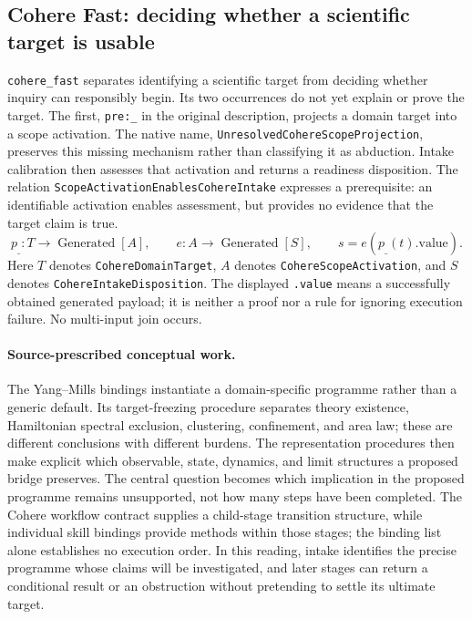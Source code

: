 %
%
%
\subsection{Cohere Fast: deciding whether a scientific target is usable}
\label{app:granular-cohere_fast}
\texttt{cohere\_fast} separates identifying a scientific target from deciding whether inquiry can responsibly begin. Its two occurrences do not yet explain or prove the target. The first, \texttt{pre:\_} in the original description, projects a domain target into a scope activation. The native name, \texttt{Unresolved\allowbreak Cohere\allowbreak Scope\allowbreak Projection}, preserves this missing mechanism rather than classifying it as abduction. Intake calibration then assesses that activation and returns a readiness disposition. The relation \texttt{Scope\allowbreak Activation\allowbreak Enables\allowbreak Cohere\allowbreak Intake} expresses a prerequisite: an identifiable activation enables assessment, but provides no evidence that the target claim is true.
\[
 p_{\_}:T\to\operatorname{Generated}[A],\qquad
 e:A\to\operatorname{Generated}[S],\qquad s=e(p_{\_}(t).\mathrm{value}).
\]
Here $T$ denotes \texttt{Cohere\allowbreak Domain\allowbreak Target}, $A$ denotes \texttt{Cohere\allowbreak Scope\allowbreak Activation}, and $S$ denotes \texttt{Cohere\allowbreak Intake\allowbreak Disposition}. The displayed \texttt{.value} means a successfully obtained generated payload; it is neither a proof nor a rule for ignoring execution failure. No multi-input join occurs.

\paragraph{Source-prescribed conceptual work.}
The Yang--Mills bindings instantiate a domain-specific programme rather than a generic default. Its target-freezing procedure separates theory existence, Hamiltonian spectral exclusion, clustering, confinement, and area law; these are different conclusions with different burdens. The representation procedures then make explicit which observable, state, dynamics, and limit structures a proposed bridge preserves. The central question becomes which implication in the proposed programme remains unsupported, not how many steps have been completed. The Cohere workflow contract supplies a child-stage transition structure, while individual skill bindings provide methods within those stages; the binding list alone establishes no execution order. In this reading, intake identifies the precise programme whose claims will be investigated, and later stages can return a conditional result or an obstruction without pretending to settle its ultimate target.

